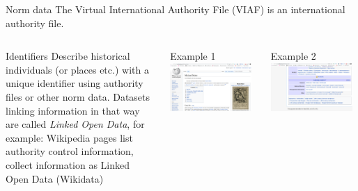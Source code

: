 \begin{frame}[allowframebreaks]{Norm data}
  The Virtual International Authority File (VIAF) is an international authority file.

  \begin{columns}[T,onlytextwidth]
      \begin{block}{Identifiers}
        Describe historical individuals (or places etc.) with a unique identifier using authority files or other norm data. 
Datasets linking information in that way are called \emph{Linked Open Data}, for example: Wikipedia pages list authority control information, collect information as Linked Open Data (Wikidata)
      \end{block}



      \begin{block}{Example 1}
        \includegraphics[width=0.95\textwidth]{img/mmaier-wiki1.png}
      \end{block}
      
            \begin{block}{Example 2}
        \includegraphics[width=0.95\textwidth]{img/mmaier-wiki2.png}
      \end{block}



\end{columns}
\end{frame}
